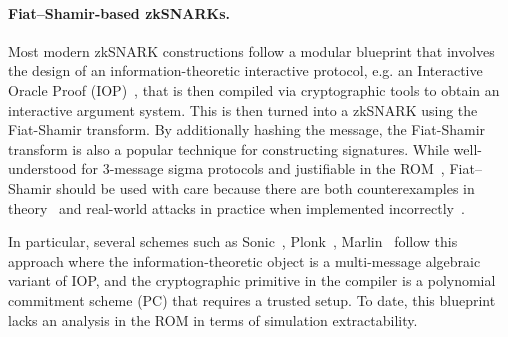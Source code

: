 \documentclass[10pt]{llncs}
\newcommand{\plonk}{\ensuremath{\textnormal{{Plonk}}}}
\newcommand{\marlin}{{\ensuremath{\textnormal{{Marlin}}}}}
\newcommand{\sonic}{{\ensuremath{\textnormal{{Sonic}}}}}
\begin{document}

\paragraph{Fiat--Shamir-based zkSNARKs.}
Most modern zkSNARK constructions follow a modular blueprint that involves the design of an information-theoretic interactive protocol, e.g. an Interactive Oracle Proof (IOP)~\cite{TCC:BenChiSpo16}, that is then compiled via cryptographic tools to obtain an interactive argument system. This is then turned into a zkSNARK using the Fiat-Shamir transform. By additionally hashing the message, the Fiat-Shamir transform is also a popular technique for constructing signatures. While well-understood for 3-message sigma protocols and justifiable in the ROM~\cite{CCS:BelRog93}, Fiat--Shamir should be used with
care because there are both counterexamples in theory~\cite{FOCS:GolKal03} and real-world attacks in practice when implemented incorrectly~\cite{Blog:FrozenHeart20}.

%

In particular, several schemes such as
Sonic~\cite{CCS:MBKM19}, Plonk~\cite{EPRINT:GabWilCio19}, Marlin~\cite{EC:CHMMVW20} 
follow this approach where the information-theoretic object is a multi-message algebraic variant of IOP, and the cryptographic primitive in the compiler is a polynomial commitment scheme (PC) that requires a trusted setup. To date, this blueprint lacks an analysis in the ROM in terms of simulation extractability.
\end{document}

